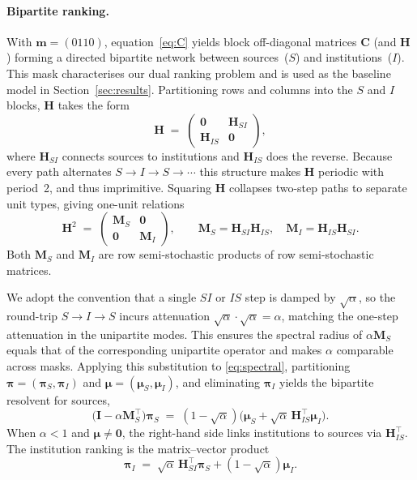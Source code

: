 \paragraph{Bipartite ranking.}
With $\mathbf{m}=(0110)$, equation~\eqref{eq:C} yields block off-diagonal matrices $\mathbf{C}$ (and $\mathbf{H}$) forming a directed bipartite network between sources~($S$) and institutions~($I$).
This mask characterises our dual ranking problem and is used as the baseline model in Section~\ref{sec:results}.
Partitioning rows and columns into the $S$ and $I$ blocks, $\mathbf{H}$ takes the form
\begin{equation}
  \mathbf{H}
  \;=\;
  \begin{pmatrix} \mathbf{0} & \mathbf{H}_{SI} \\ \mathbf{H}_{IS} & \mathbf{0} \end{pmatrix},
  \label{eq:H_bipartite}
\end{equation}
where $\mathbf{H}_{SI}$ connects sources to institutions and $\mathbf{H}_{IS}$ does the reverse.
Because every path alternates $S\to I\to S\to\cdots$ this structure makes $\mathbf{H}$ periodic with period~2, and thus imprimitive.
Squaring $\mathbf{H}$ collapses two-step paths to separate unit types, giving one-unit relations
\[
  \mathbf{H}^2
  \;=\;
  \begin{pmatrix} \mathbf{M}_S & \mathbf{0} \\ \mathbf{0} & \mathbf{M}_I \end{pmatrix},
  \qquad
  \mathbf{M}_S = \mathbf{H}_{SI}\mathbf{H}_{IS},
  \quad
  \mathbf{M}_I = \mathbf{H}_{IS}\mathbf{H}_{SI}.
\]
Both $\mathbf{M}_S$ and $\mathbf{M}_I$ are row semi-stochastic products of row semi-stochastic matrices.

We adopt the convention that a single $SI$ or $IS$ step is damped by $\sqrt{\alpha}$, so the round-trip $S\to I\to S$ incurs attenuation $\sqrt{\alpha}\cdot\sqrt{\alpha}=\alpha$, matching the one-step attenuation in the unipartite modes. This ensures the spectral radius of $\alpha\mathbf{M}_S$ equals that of the corresponding unipartite operator and makes $\alpha$ comparable across masks.
Applying this substitution to \eqref{eq:spectral},
partitioning $\boldsymbol{\pi}=(\boldsymbol{\pi}_S,\boldsymbol{\pi}_I)$ and $\boldsymbol{\mu}=(\boldsymbol{\mu}_S,\boldsymbol{\mu}_I)$,
and eliminating $\boldsymbol{\pi}_I$ yields the bipartite resolvent for sources,
\begin{equation}
  \bigl(\mathbf{I}-\alpha\mathbf{M}_S^\top\bigr)\boldsymbol{\pi}_S
  \;=\;
  (1-\sqrt{\alpha})\bigl(\boldsymbol{\mu}_S+\sqrt{\alpha}\,\mathbf{H}_{IS}^\top\boldsymbol{\mu}_I\bigr).
  \label{eq:kh_source}
\end{equation}
When $\alpha<1$ and $\boldsymbol{\mu}\ne\mathbf{0}$, the right-hand side links institutions to sources via $\mathbf{H}_{IS}^\top$. The institution ranking is the matrix--vector product
\begin{equation}
  \boldsymbol{\pi}_I
  \;=\;
  \sqrt{\alpha}\,\mathbf{H}_{SI}^\top\boldsymbol{\pi}_S+(1-\sqrt{\alpha})\boldsymbol{\mu}_I.
  \label{eq:kh_inst}
\end{equation}

